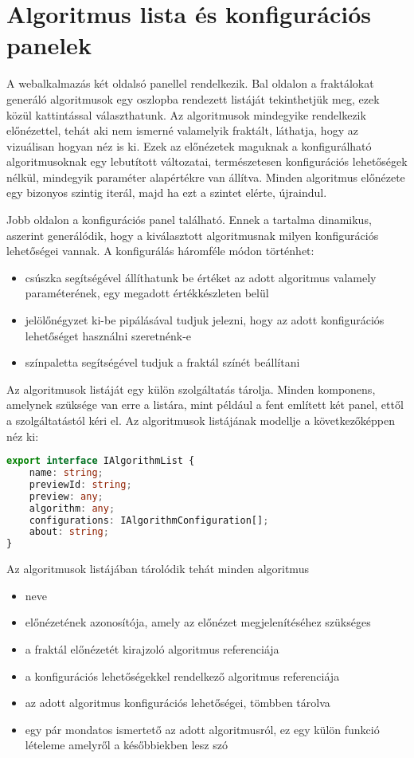 \section{Algoritmus lista és konfigurációs panelek}
A webalkalmazás két oldalsó panellel rendelkezik. Bal oldalon a fraktálokat generáló algoritmusok egy oszlopba rendezett listáját tekinthetjük meg, ezek közül kattintással választhatunk. Az algoritmusok mindegyike rendelkezik előnézettel, tehát aki nem ismerné valamelyik fraktált, láthatja, hogy az vizuálisan hogyan néz is ki. Ezek az előnézetek maguknak a konfigurálható algoritmusoknak egy lebutított változatai, természetesen konfigurációs lehetőségek nélkül, mindegyik paraméter alapértékre van állítva. Minden algoritmus előnézete egy bizonyos szintig iterál, majd ha ezt a szintet elérte, újraindul. 
\par Jobb oldalon a konfigurációs panel található. Ennek a tartalma dinamikus, aszerint generálódik, hogy a kiválasztott algoritmusnak milyen konfigurációs lehetőségei vannak. A konfigurálás háromféle módon történhet:
\begin{itemize}
	\item  csúszka segítségével állíthatunk be értéket az adott algoritmus valamely paraméterének, egy megadott értékkészleten belül
	\item jelölőnégyzet ki-be pipálásával tudjuk jelezni, hogy az adott konfigurációs lehetőséget használni szeretnénk-e
	\item színpaletta segítségével tudjuk a fraktál színét beállítani
\end{itemize}
\par Az algoritmusok listáját egy külön szolgáltatás tárolja. Minden komponens, amelynek szüksége van erre a listára, mint például a fent említett két panel, ettől a szolgáltatástól kéri el. Az algoritmusok listájának modellje a következőképpen néz ki:
\begin{lstlisting}[language=typescript]
export interface IAlgorithmList {
	name: string;
	previewId: string;
	preview: any;
	algorithm: any;
	configurations: IAlgorithmConfiguration[];
	about: string;
}
\end{lstlisting}
Az algoritmusok listájában tárolódik tehát minden algoritmus
\begin{itemize}
	\item neve
	\item előnézetének azonosítója, amely az előnézet megjelenítéséhez szükséges
	\item a fraktál előnézetét kirajzoló algoritmus referenciája
	\item a konfigurációs lehetőségekkel rendelkező algoritmus referenciája
	\item az adott algoritmus konfigurációs lehetőségei, tömbben tárolva
	\item egy pár mondatos ismertető az adott algoritmusról, ez egy külön funkció lételeme amelyről a későbbiekben lesz szó
\end{itemize}
